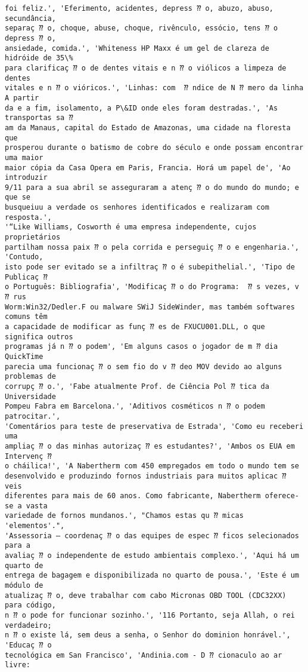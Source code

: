 \documentclass[10pt]{article}
\begin{document}
\begin{Verbatim}[commandchars=\\\{\}]
foi feliz.', 'Eferimento, acidentes, depress ⁇ o, abuzo, abuso, secundância,
separaç ⁇ o, choque, abuse, choque, rivênculo, essócio, tens ⁇ o depress ⁇ o,
ansiedade, comida.', 'Whiteness HP Maxx é um gel de clareza de hidróide de 35\%
para clarificaç ⁇ o de dentes vitais e n ⁇ o viólicos a limpeza de dentes
vitales e n ⁇ o vióricos.', 'Linhas: com  ⁇ ndice de N ⁇ mero da linha A partir
da e a fim, isolamento, a P\&ID onde eles foram destradas.', 'As transportas sa ⁇
am da Manaus, capital do Estado de Amazonas, uma cidade na floresta que
prosperou durante o batismo de cobre do século e onde possam encontrar uma maior
maior cópia da Casa Opera em Paris, Francia. Horá um papel de', 'Ao introduzir
9/11 para a sua abril se asseguraram a atenç ⁇ o do mundo do mundo; e que se
busqueiuu a verdade os senhores identificados e realizaram com resposta.',
'“Like Williams, Cosworth é uma empresa independente, cujos proprietários
partilham nossa paix ⁇ o pela corrida e perseguiç ⁇ o e engenharia.', 'Contudo,
isto pode ser evitado se a infiltraç ⁇ o é subepithelial.', 'Tipo de Publicaç ⁇
o Português: Bibliografia', 'Modificaç ⁇ o do Programa:  ⁇ s vezes, v ⁇ rus
Worm:Win32/Dedler.F ou malware SWiJ SideWinder, mas também softwares comuns têm
a capacidade de modificar as funç ⁇ es de FXUCU001.DLL, o que significa outros
programas já n ⁇ o podem', 'Em alguns casos o jogador de m ⁇ dia QuickTime
parecia uma funcionaç ⁇ o sem fio do v ⁇ deo MOV devido ao alguns problemas de
corrupç ⁇ o.', 'Fabe atualmente Prof. de Ciência Pol ⁇ tica da Universidade
Pompeu Fabra em Barcelona.', 'Aditivos cosméticos n ⁇ o podem patrocitar.',
'Comentários para teste de preservativa de Estrada', 'Como eu receberi uma
ampliaç ⁇ o das minhas autorizaç ⁇ es estudantes?', 'Ambos os EUA em Intervenç ⁇
o cháilica!', 'A Nabertherm com 450 empregados em todo o mundo tem se
desenvolvido e produzindo fornos industriais para muitos aplicac ⁇ veis
diferentes para mais de 60 anos. Como fabricante, Nabertherm oferece-se a vasta
variedade de fornos mundanos.', "Chamos estas qu ⁇ micas 'elementos'.",
'Assessoria – coordenaç ⁇ o das equipes de espec ⁇ ficos selecionados para a
avaliaç ⁇ o independente de estudo ambientais complexo.', 'Aqui há um quarto de
entrega de bagagem e disponibilizada no quarto de pousa.', 'Este é um módulo de
atualizaç ⁇ o, deve trabalhar com cabo Micronas OBD TOOL (CDC32XX) para código,
n ⁇ o pode for funcionar sozinho.', '116 Portanto, seja Allah, o rei verdadeiro;
n ⁇ o existe lá, sem deus a senha, o Senhor do dominion honrável.', 'Educaç ⁇ o
tecnológica em San Francisco', 'Andinia.com - D ⁇ cionaculo ao ar livre:

\end{Verbatim}
\end{document}
